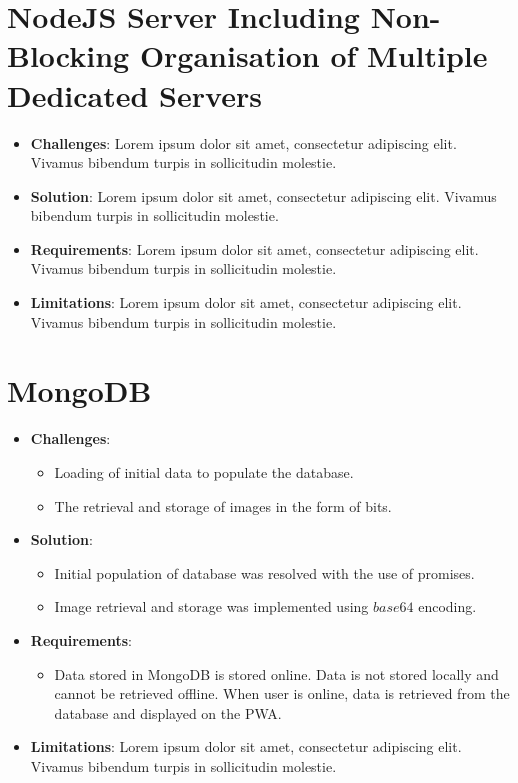 \documentclass[11pt, a4paper]{article}
\begin{document}
\section{NodeJS Server Including Non-Blocking Organisation of Multiple Dedicated Servers}
\begin{itemize}
  \item \textbf{Challenges}: Lorem ipsum dolor sit amet, consectetur adipiscing elit. Vivamus
  bibendum turpis in sollicitudin molestie.
  \item \textbf{Solution}: Lorem ipsum dolor sit amet, consectetur adipiscing elit. Vivamus bibendum
  turpis in sollicitudin molestie.
  \item \textbf{Requirements}: Lorem ipsum dolor sit amet, consectetur adipiscing elit. Vivamus
  bibendum turpis in sollicitudin molestie.
  \item \textbf{Limitations}: Lorem ipsum dolor sit amet, consectetur adipiscing elit. Vivamus
  bibendum turpis in sollicitudin molestie.
\end{itemize}

\section{MongoDB}
\begin{itemize}
  \item \textbf{Challenges}:
  \begin{itemize}
    \item Loading of initial data to populate the database.
    \item The retrieval and storage of images in the form of bits.
  \end{itemize}
  \item \textbf{Solution}:
  \begin{itemize}
    \item Initial population of database was resolved with the use of promises.
    \item Image retrieval and storage was implemented using $base64$ encoding.
  \end{itemize}
  \item \textbf{Requirements}:
  \begin{itemize}
    \item Data stored in MongoDB is stored online. Data is not stored locally and cannot be
    retrieved offline. When user is online, data is retrieved from the database and displayed on the
    PWA.
  \end{itemize}
  \item \textbf{Limitations}: Lorem ipsum dolor sit amet, consectetur adipiscing elit. Vivamus
  bibendum turpis in sollicitudin molestie.
\end{itemize}
\end{document}
